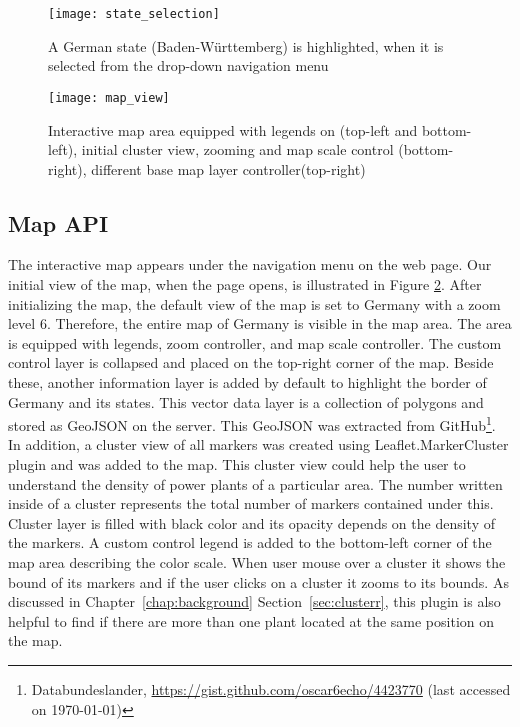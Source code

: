 \begin{figure}
  \begin{center}
    \texttt{[image: state\_selection]}
    \caption[A German state (Baden-Württemberg) is highlighted]{A German state (Baden-Württemberg) is highlighted, when it is selected from the drop-down navigation menu}
    \label{fig:stateSelection}
  \end{center}
\end{figure}

\begin{figure}
  \begin{center}
    \texttt{[image: map\_view]}
    \caption[Interactive map area]{Interactive map area equipped with legends on (top-left and bottom-left), initial cluster view, zooming and map scale control (bottom-right), different base map layer controller(top-right)}
    \label{fig:mapView}
  \end{center}
\end{figure}

\subsection{Map API}
\label{sssec:mapArea}

The interactive map appears under the navigation menu on the web page. Our initial view of the map, when the page opens, is illustrated in Figure \ref{fig:mapView}. After initializing the map, the default view of the map is set to Germany with a zoom level 6. Therefore, the entire map of Germany is visible in the map area. The area is equipped with legends, zoom controller, and map scale controller. The custom control layer is collapsed and placed on the top-right corner of the map. Beside these, another information layer is added by default to highlight the border of Germany and its states. This vector data layer is a collection of polygons and stored as GeoJSON on the server. This GeoJSON was extracted from GitHub\footnote{Databundeslander, \url{https://gist.github.com/oscar6echo/4423770} (last accessed on \today)}. In addition, a cluster view of all markers was created using Leaflet.MarkerCluster plugin and was added to the map. This cluster view could help the user to understand the density of power plants of a particular area. The number written inside of a cluster represents the total number of markers contained under this. Cluster layer is filled with black color and its opacity depends on the density of the markers. A custom control legend is added to the bottom-left corner of the map area describing the color scale. When user mouse over a cluster it shows the bound of its markers and if the user clicks on a cluster it zooms to its bounds. As discussed in Chapter~\ref{chap:background} Section~\ref{sec:clusterr}, this plugin is also helpful to find if there are more than one plant located at the same position on the map.

